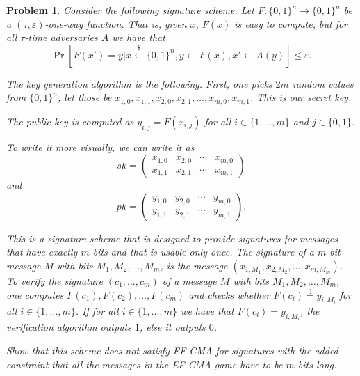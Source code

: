\documentclass{../homework}
\newtheorem{problem}{Problem}
\newcommand{\rgets}{\stackrel{\mathdollar}\leftarrow}
\newcommand{\iseq}{\stackrel{?}=}
\begin{document}
\begin{problem}
    Consider the following signature scheme. Let
    $F:\{0,1\}^n \rightarrow \{0,1\}^n$ be a $(\tau,\varepsilon)$-one-way
    function. That is, given $x$, $F(x)$ is easy to compute, but for all
    $\tau$-time adversaries $A$ we have that
    $$
    \Pr[F(x')=y|x\rgets \{0,1\}^n, y\gets F(x), x'\gets A(y)]\leq \varepsilon.
    $$
    
    The key generation algorithm is the following. First, one picks $2m$ random
    values from $\{0,1\}^n$, let those be
    $x_{1,0},x_{1,1},x_{2,0},x_{2,1},\dots,x_{m,0},x_{m,1}$. This is our secret
    key.
    
    The public key is computed as $y_{i,j}=F(x_{i,j})$ for all
    $i\in \{1,\dots,m\}$ and $j\in\{0,1\}$.
    
    To write it more visually, we can write it as 
    $$
    sk=
    \begin{pmatrix}
        x_{1,0} & x_{2,0} & \cdots & x_{m,0} \\
        x_{1,1} & x_{2,1} & \cdots & x_{m,1} 
    \end{pmatrix}
    $$
    and
    $$
    pk=
    \begin{pmatrix}
        y_{1,0} & y_{2,0} & \cdots & y_{m,0} \\
        y_{1,1} & y_{2,1} & \cdots & y_{m,1}
    \end{pmatrix}.
    $$
    
    This is a signature scheme that is designed to provide signatures for
    messages that have exactly $m$ bits and that is usable only once. The
    signature of a $m$-bit message $M$ with bits $M_1,M_2,\dots,M_m$, is the
    message $(x_{1,M_1},x_{2,M_2},\dots,x_{m,M_m})$. To verify the signature
    $(c_1,\dots,c_m)$ of a message $M$ with bits $M_1,M_2,\dots,M_m$, one
    computes $F(c_1),F(c_2),\dots,F(c_m)$ and checks whether
    $F(c_i) \iseq y_{i,M_i}$ for all $i\in \{1,\dots,m\}$. If for all
    $i\in \{1,\dots,m\}$ we have that $F(c_i) = y_{i,M_i}$, the verification
    algorithm outputs $1$, else it outputs $0$.
    
    Show that this scheme does not satisfy EF-CMA for signatures with the added
    constraint that all the messages in the EF-CMA game have to be $m$ bits
    long.
\end{problem}
\end{document}
